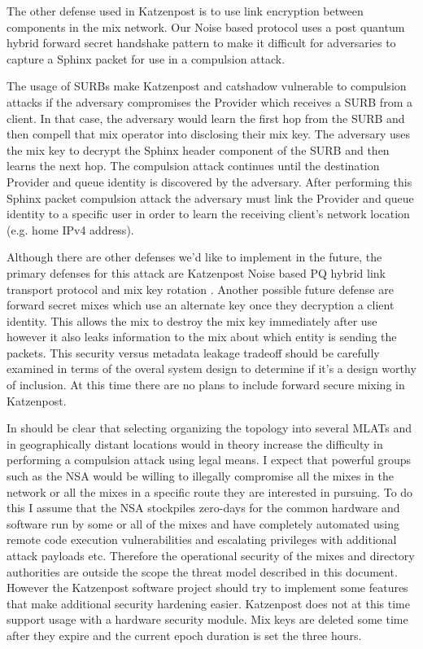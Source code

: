 \documentclass[conference]{IEEEtran}
\begin{document}
The other defense used in Katzenpost is to use link encryption between
components in the mix network. Our Noise based protocol
\cite{KatzMixWire} uses a post quantum hybrid forward secret handshake
pattern to make it difficult for adversaries to capture a Sphinx
packet for use in a compulsion attack.

The usage of SURBs make Katzenpost and catshadow vulnerable to
compulsion attacks if the adversary compromises the Provider which
receives a SURB from a client.  In that case, the adversary would
learn the first hop from the SURB and then compell that mix operator
into disclosing their mix key. The adversary uses the mix key to
decrypt the Sphinx header component of the SURB and then learns the
next hop. The compulsion attack continues until the destination
Provider and queue identity is discovered by the adversary. After
performing this Sphinx packet compulsion attack the adversary must
link the Provider and queue identity to a specific user in order to
learn the receiving client's network location (e.g. home IPv4
address).

Although there are other defenses \cite{ih05-danezisclulow} we'd like
to implement in the future, the primary defenses for this attack are
Katzenpost Noise based PQ hybrid link transport protocol
\cite{KatzMixWire} and mix key rotation \cite{KatzMixPKI}. Another
possible future defense are forward secret mixes \cite{Dan:SFMix03}
which use an alternate key once they decryption a client
identity. This allows the mix to destroy the mix key immediately after
use however it also leaks information to the mix about which entity is
sending the packets. This security versus metadata leakage tradeoff
should be carefully examined in terms of the overal system design to
determine if it's a design worthy of inclusion.  At this time there
are no plans to include forward secure mixing in Katzenpost.

In should be clear that selecting organizing the topology into several
MLATs and in geographically distant locations would in theory increase
the difficulty in performing a compulsion attack using legal means. I
expect that powerful groups such as the NSA would be willing to
illegally compromise all the mixes in the network or all the mixes in
a specific route they are interested in pursuing. To do this I assume
that the NSA stockpiles zero-days for the common hardware and software
run by some or all of the mixes and have completely automated using
remote code execution vulnerabilities and escalating privileges with
additional attack payloads etc. Therefore the operational security of
the mixes and directory authorities are outside the scope the threat
model described in this document. However the Katzenpost software
project should try to implement some features that make additional
security hardening easier.  Katzenpost does not at this time support
usage with a hardware security module.  Mix keys are deleted some time
after they expire and the current epoch duration is set the three
hours.
\end{document}
